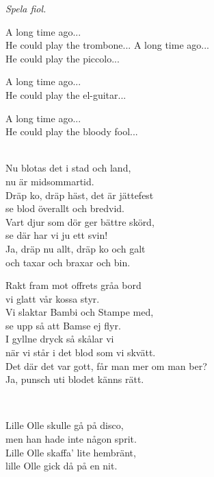 {\textit{Spela fiol.}}

\songtext{} A long time ago...\\
He could play the trombone...
\newpage
A long time ago...\\
He could play the piccolo...

A long time ago...\\
He could play the el-guitar...

A long time ago...\\
He could play the bloody fool...\\

 \\       

\songtext{}Nu blotas det i stad och land, \\  
nu är midsommartid. \\ 
Dräp ko, dräp häst, det är jättefest \\ 
se blod överallt och bredvid. \\ 
Vart djur som dör ger bättre skörd, \\ 
se där har vi ju ett svin! \\ 
Ja, dräp nu allt, dräp ko och galt \\ 
och taxar och braxar och bin.

Rakt fram mot offrets gråa bord \\ 
vi glatt vår kossa styr. \\ 
Vi slaktar Bambi och Stampe med, \\ 
se upp så att Bamse ej flyr. \\ 
I gyllne dryck så skålar vi \\ 
när vi står i det blod som vi skvätt. \\ 
Det där det var gott, får man mer om man ber? \\ 
Ja, punsch uti blodet känns rätt.


\newpage 


 \\       
\author{Text: Calle Isaksson}

\songtext{}
Lille Olle skulle gå på disco,\\
men han hade inte någon sprit.\\
Lille Olle skaffa' lite hembränt,\\
lille Olle gick då på en nit.

